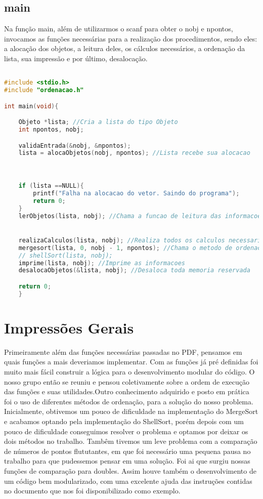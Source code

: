 \documentclass{article}
\begin{document}
\clearpage
\subsection{main}

Na função main, além de utilizarmos o scanf para obter o nobj e npontos, invocamos as funções necessárias para a realização dos procedimentos, sendo eles: a alocação dos objetos, a leitura deles, os cálculos necessários, a ordenação da lista, sua impressão e por último, desalocação.

\begin{lstlisting}[caption={função main},label={lst:cod11},language=C]

#include <stdio.h>
#include "ordenacao.h"

int main(void){

    Objeto *lista; //Cria a lista do tipo Objeto
    int npontos, nobj;

    validaEntrada(&nobj, &npontos);
    lista = alocaObjetos(nobj, npontos); //Lista recebe sua alocacao



    if (lista ==NULL){
        printf("Falha na alocacao do vetor. Saindo do programa");
        return 0;
    }
    lerObjetos(lista, nobj); //Chama a funcao de leitura das informacoes de cada objeto


    realizaCalculos(lista, nobj); //Realiza todos os calculos necessarios
    mergesort(lista, 0, nobj - 1, npontos); //Chama o metodo de ordenacao
    // shellSort(lista, nobj);
    imprime(lista, nobj); //Imprime as informacoes
    desalocaObjetos(&lista, nobj); //Desaloca toda memoria reservada

    return 0;
    }
\end{lstlisting}

\clearpage


\section{Impressões Gerais}

Primeiramente além das funções necessárias passadas no PDF, pensamos em quais funções a mais
deveriamos implementar. Com as funções já pré definidas foi muito mais fácil construir 
a lógica para o desenvolvimento modular do código. O nosso grupo então se
reuniu e pensou coletivamente sobre a ordem de execução das funções e suas 
utilidades.Outro conhecimento adquirido e posto em prática foi o uso de 
diferentes métodos de ordenação, para a solução do nosso problema.
Inicialmente, obtivemos um pouco de dificuldade na implementação do MergeSort e acabamos optando
pela implementação do ShellSort, porém depois com um pouco de dificuldade conseguimos resolver o problema
e optamos por deixar os dois métodos no trabalho.
Tambêm tivemos um leve problema com a comparação de números de pontos flututantes, em que foi necessário uma pequena
pausa no trabalho para que pudessemos pensar em uma solução. Foi ai que surgiu nossas funções de comparação para doubles.
Assim houve também o desenvolvimento de um código bem modularizado, 
com uma excelente ajuda das instruções contidas no documento que nos foi disponibilizado como exemplo.
\end{document}
